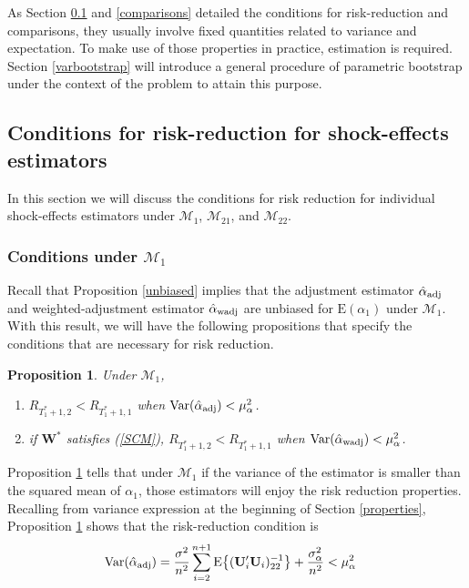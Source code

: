 \documentclass[11pt]{article}
\def\mbf#1{\mathbf{#1}} %
\def\mrm#1{\mathrm{#1}} %
\def\mc#1{\mathcal{#1}} %
\def\E#1{\mathrm{E}(#1)} %
\def\var#1{\mathrm{Var}(#1)} %
\DeclareMathOperator{\Var}{Var} %
\newtheorem{prop}{Proposition}
\theoremstyle{definition}
\begin{document}
As Section \ref{conditions} and \ref{comparisons} detailed the conditions for risk-reduction and comparisons, they usually involve fixed quantities related to variance and expectation. To make use of those properties in practice, estimation is required. Section \ref{varbootstrap} will introduce a general procedure of parametric bootstrap under the context of the problem to attain this purpose.


\subsection{Conditions for risk-reduction for shock-effects estimators}
\label{conditions}

In this section we will discuss the conditions for risk reduction for individual shock-effects estimators under $\mc{M}_1$, $\mc{M}_{21}$, and $\mc{M}_{22}$. %

\subsubsection{Conditions under $\mc{M}_1$}
 \label{conditionsmodel1}
 
Recall that Proposition \ref{unbiased} implies that the adjustment estimator $\hat{\alpha}_{\rm adj}$ and weighted-adjustment estimator $\hat{\alpha}_{\rm wadj}$ are unbiased for $\E{\alpha_1}$ under $\mc{M}_1$. With this result, we will have  the following propositions that specify the conditions that are necessary for risk reduction. 

\begin{prop}
\label{proprisk}Under $\mc{M}_1$,
\begin{enumerate}[label = (\roman*)]
  \item  $R_{T_1^*+1, 2} < R_{T_1^*+1, 1}$ when 
$\Var(\hat{\alpha}_{\rm adj}) < \mu_{\alpha}^2$.
  \item if $\mbf{W}^*$ satisfies (\ref{SCM}), $R_{T_1^*+1,2}<R_{T_1^*+1,1}$ when $\var{\hat{\alpha}_{\rm wadj}}<\mu_{\alpha}^2$. 
\end{enumerate}
\end{prop}

Proposition \ref{proprisk} tells that under $\mc{M}_1$ if the variance of the estimator is smaller than the squared mean of $\alpha_1$, those estimators will enjoy the risk reduction properties. Recalling from variance expression at the beginning of Section \ref{properties}, Proposition \ref{proprisk} shows that the risk-reduction condition is
\begin{align}
  \var{\hat{\alpha}_{\rm adj}} 
  &=\frac{\sigma^2}{n^2}\sum_{i=2}^{n+1}\mrm{E}\big\{(\mbf{U}'_i\mbf{U}_i)^{-1}_{22}\big\}+\frac{\sigma^2_{\alpha}}{n^2} < \mu_{\alpha}^2 \label{riskconditionadj}
\end{align}
\end{document}

